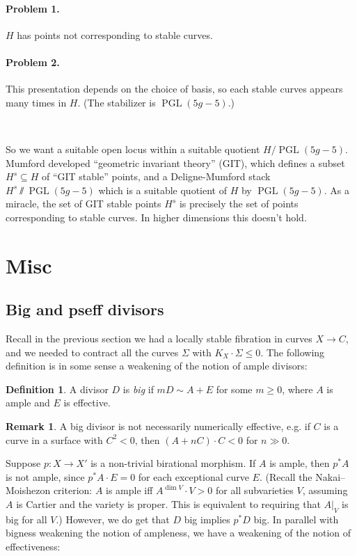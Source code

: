\documentclass{article}
\theoremstyle{definition}
\newtheorem*{definition}{Definition}
\newtheorem*{remark}{Remark}
\DeclareMathOperator{\PGL}{PGL}
\begin{document}
\paragraph{Problem 1.} $H$ has points not corresponding to stable curves.

\paragraph{Problem 2.} This presentation depends on the choice of basis, so each
stable curves appears many times in $H$. (The stabilizer is $\PGL(5g-5)$.)

~

So we want a suitable open locus within a suitable quotient $H/\PGL(5g-5)$.
Mumford developed ``geometric invariant theory'' (GIT), which defines a subset
$H^s\subseteq H$ of ``GIT stable'' points, and a Deligne-Mumford stack
$H^s\sslash\PGL(5g-5)$ which is a suitable quotient of $H$ by $\PGL(5g-5)$. As a
miracle, the set of GIT stable points $H^s$ is precisely the set of points
corresponding to stable curves. In higher dimensions this doesn't hold.

\section*{Misc}

\subsection*{Big and pseff divisors}

Recall in the previous section we had a locally stable fibration in curves
$X\to C$, and we needed to contract all the curves $\Sigma$ with
$K_X\cdot\Sigma\le0$. The following definition is in some sense a weakening of
the notion of ample divisors:

\begin{definition}
    A divisor $D$ is \emph{big} if $mD\sim A+E$ for some $m\ge0$, where $A$ is
    ample and $E$ is effective.
\end{definition}

\begin{remark}
    A big divisor is not necessarily numerically effective, e.g. if $C$ is a
    curve in a surface with $C^2<0$, then $(A+nC)\cdot C<0$ for $n\gg0$.
\end{remark}

Suppose $p:X\to X'$ is a non-trivial birational morphism. If $A$ is ample, then
$p^*A$ is not ample, since $p^*A\cdot E=0$ for each exceptional curve $E$.
(Recall the Nakai--Moishezon criterion: $A$ is ample iff $A^{\dim V}\cdot V>0$
for all subvarieties $V$, assuming $A$ is Cartier and the variety is proper.
This is equivalent to requiring that $A|_V$ is big for all $V$.) However, we do
get that $D$ big implies $p^*D$ big. In parallel with bigness weakening the
notion of ampleness, we have a weakening of the notion of effectiveness:
\end{document}
